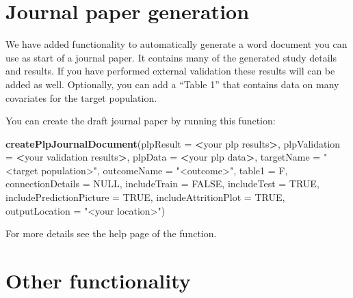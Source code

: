 \documentclass[]{book}
\newenvironment{Shaded}{\begin{snugshade}}{\end{snugshade}}
\newcommand{\KeywordTok}[1]{\textcolor[rgb]{0.13,0.29,0.53}{\textbf{#1}}}
\newcommand{\DataTypeTok}[1]{\textcolor[rgb]{0.13,0.29,0.53}{#1}}
\newcommand{\StringTok}[1]{\textcolor[rgb]{0.31,0.60,0.02}{#1}}
\newcommand{\OtherTok}[1]{\textcolor[rgb]{0.56,0.35,0.01}{#1}}
\newcommand{\OperatorTok}[1]{\textcolor[rgb]{0.81,0.36,0.00}{\textbf{#1}}}
\newcommand{\NormalTok}[1]{#1}
\begin{document}
\section{Journal paper generation}\label{journal-paper-generation}

We have added functionality to automatically generate a word document
you can use as start of a journal paper. It contains many of the
generated study details and results. If you have performed external
validation these results will can be added as well. Optionally, you can
add a ``Table 1'' that contains data on many covariates for the target
population.

You can create the draft journal paper by running this function:

\begin{Shaded}
\begin{Highlighting}[]
 \KeywordTok{createPlpJournalDocument}\NormalTok{(}\DataTypeTok{plpResult =} \OperatorTok{<}\NormalTok{your plp results}\OperatorTok{>}\NormalTok{, }
                          \DataTypeTok{plpValidation =} \OperatorTok{<}\NormalTok{your validation results}\OperatorTok{>}\NormalTok{,}
                          \DataTypeTok{plpData =} \OperatorTok{<}\NormalTok{your plp data}\OperatorTok{>}\NormalTok{, }
                          \DataTypeTok{targetName =} \StringTok{"<target population>"}\NormalTok{,}
                          \DataTypeTok{outcomeName =} \StringTok{"<outcome>"}\NormalTok{, }
                          \DataTypeTok{table1 =}\NormalTok{ F, }
                          \DataTypeTok{connectionDetails =} \OtherTok{NULL}\NormalTok{,}
                          \DataTypeTok{includeTrain =} \OtherTok{FALSE}\NormalTok{,}
                          \DataTypeTok{includeTest =} \OtherTok{TRUE}\NormalTok{,}
                          \DataTypeTok{includePredictionPicture =} \OtherTok{TRUE}\NormalTok{,}
                          \DataTypeTok{includeAttritionPlot =} \OtherTok{TRUE}\NormalTok{,}
                          \DataTypeTok{outputLocation =} \StringTok{"<your location>"}\NormalTok{)}
\end{Highlighting}
\end{Shaded}

For more details see the help page of the function.

\newpage

\section{Other functionality}\label{other-functionality}
\end{document}
